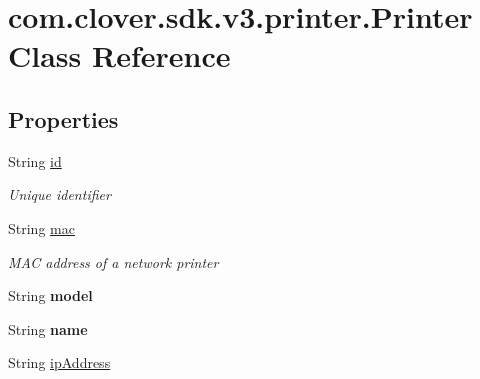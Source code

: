 \hypertarget{classcom_1_1clover_1_1sdk_1_1v3_1_1printer_1_1_printer}{}\section{com.\+clover.\+sdk.\+v3.\+printer.\+Printer Class Reference}
\label{classcom_1_1clover_1_1sdk_1_1v3_1_1printer_1_1_printer}
\subsection*{Properties}
\begin{DoxyCompactItemize}
\item 
String \hyperlink{classcom_1_1clover_1_1sdk_1_1v3_1_1printer_1_1_printer_a6c1405e0e17d04064909c54fff864c52}{id}
\begin{DoxyCompactList}\small\item\em Unique identifier \end{DoxyCompactList}\item 
String \hyperlink{classcom_1_1clover_1_1sdk_1_1v3_1_1printer_1_1_printer_a825fc6d7756bc5cd403603cc05f73544}{mac}
\begin{DoxyCompactList}\small\item\em M\+AC address of a network printer \end{DoxyCompactList}\item 
\mbox{\label{classcom_1_1clover_1_1sdk_1_1v3_1_1printer_1_1_printer_aca3a0851adadd2f659cbe38169b5a76e}} 
String {\bfseries model}
\item 
\mbox{\label{classcom_1_1clover_1_1sdk_1_1v3_1_1printer_1_1_printer_a05efe88ab5923d18ab62cb78f958e083}} 
String {\bfseries name}
\item 
String \hyperlink{classcom_1_1clover_1_1sdk_1_1v3_1_1printer_1_1_printer_a25c08767d6d7cb105bf451f458e97c70}{ip\+Address}

\end{DoxyCompactItemize}
